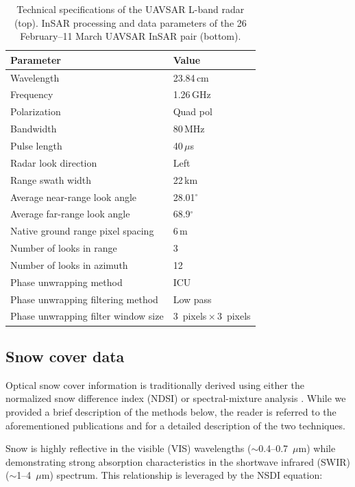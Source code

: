 \begin{table}[t]
\centering
\label{tab:uavsar_specs}
\caption{Technical specifications of the UAVSAR L-band radar (top). InSAR processing and data parameters of the 26 February--11 March UAVSAR InSAR pair (bottom).}
\begin{tabular}{ll}
\toprule Parameter & Value \\
\midrule
Wavelength & 23.84\,cm \\
Frequency & 1.26\,GHz \\
Polarization & Quad pol \\
Bandwidth & 80\,MHz \\
Pulse length & 40\,$\mu$s \\
Radar look direction & Left \\
Range swath width & 22\,km \\
Average near-range look angle & 28.01$^{\circ}$\\
Average far-range look angle & 68.9$^{\circ}$\\
\midrule
Native ground range pixel spacing & 6\,m \\
Number of looks in range & 3 \\
Number of looks in azimuth & 12 \\
Phase unwrapping method & ICU \\
Phase unwrapping filtering method & Low pass \\
Phase unwrapping filter window size & 3~pixels\,$\times$\,3~pixels \\
\bottomrule
\end{tabular}
\end{table}


\hypertarget{ch4-methods-2}{\subsection{Snow cover data}\label{ch4-methods-2}}

Optical snow cover information is traditionally derived using either the normalized snow difference index (NDSI) \citep{dozierSpectralSignatureAlpine1989} or spectral-mixture analysis \citep{rosenthalAutomatedMappingMontane1996,nolinMappingAlpineSnow1993}. While we provided a brief description of the methods below, the reader is referred to the aforementioned publications and \cite{stillingerLandsatMODISVIIRS2023} for a detailed description of the two techniques.

Snow is highly reflective in the visible (VIS) wavelengths ($\sim$0.4--0.7~$\mu$m) while demonstrating strong absorption characteristics in the shortwave infrared (SWIR) ($\sim$1--4~$\mu$m) spectrum. This relationship is leveraged by the NSDI equation:

